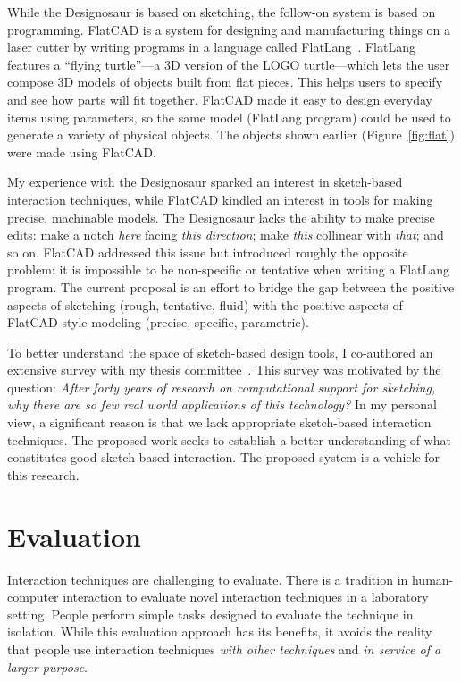 \documentclass[12pt]{article}
\begin{document}
While the Designosaur is based on sketching, the follow-on system is
based on programming. FlatCAD is a system for designing and
manufacturing things on a laser cutter by writing programs in a
language called FlatLang~\cite{johnson-flatcad}.  FlatLang features a
``flying turtle''---a 3D version of the LOGO turtle---which lets the
user compose 3D models of objects built from flat pieces. This helps
users to specify and see how parts will fit together. FlatCAD made it
easy to design everyday items using parameters, so the same model
(FlatLang program) could be used to generate a variety of physical
objects. The objects shown earlier (Figure~\ref{fig:flat}) were made
using FlatCAD.

My experience with the Designosaur sparked an interest in sketch-based
interaction techniques, while FlatCAD kindled an interest in tools for
making precise, machinable models. The Designosaur lacks the ability
to make precise edits: make a notch \textit{here} facing \textit{this
  direction}; make \textit{this} collinear with \textit{that}; and so
on. FlatCAD addressed this issue but introduced roughly the opposite
problem: it is impossible to be non-specific or tentative when writing
a FlatLang program. The current proposal is an effort to bridge the
gap between the positive aspects of sketching (rough, tentative,
fluid) with the positive aspects of FlatCAD-style modeling (precise,
specific, parametric).

To better understand the space of sketch-based design tools, I
co-authored an extensive survey with my thesis
committee~\cite{johnson-sketch-review}. This survey was motivated by
the question: \textit{After forty years of research on computational
  support for sketching, why there are so few real world applications
  of this technology?} In my personal view, a significant reason is
that we lack appropriate sketch-based interaction techniques. The
proposed work seeks to establish a better understanding of what
constitutes good sketch-based interaction. The proposed system is a
vehicle for this research.

\section{Evaluation}

Interaction techniques are challenging to evaluate. There is a
tradition in human-computer interaction to evaluate novel interaction
techniques in a laboratory setting. People perform simple tasks
designed to evaluate the technique in isolation. While this evaluation
approach has its benefits, it avoids the reality that people use
interaction techniques \textit{with other techniques} and \textit{in
  service of a larger purpose}. 
\end{document}
